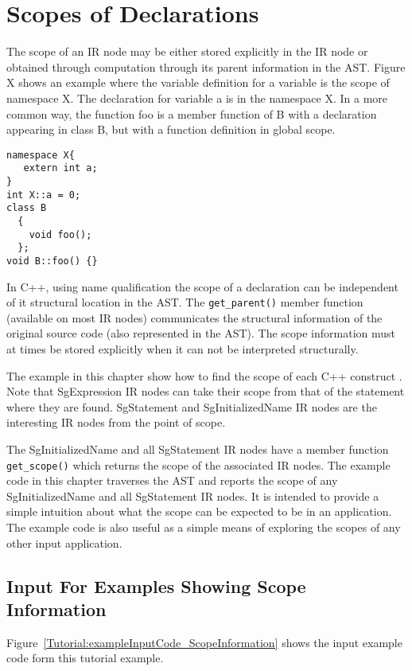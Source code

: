 \chapter{Scopes of Declarations}

     The scope of an IR node may be either stored explicitly in the IR node
or obtained through computation through its parent information in the AST.
Figure X shows an example where the variable definition for a variable is 
the scope of namespace X.  The declaration for variable a is in the namespace X.
In a more common way, the function foo is a member function of B with a
declaration appearing in class B, but with a function definition in global scope.
{\mySmallFontSize
\begin{verbatim}
namespace X{
   extern int a;
}
int X::a = 0;
class B
  {
    void foo();
  };
void B::foo() {}
\end{verbatim}
}
In C++, using name qualification the scope of a declaration can be independent of
it structural location in the AST.  The {\tt get\_parent()} member function (available 
on most IR nodes) communicates the structural information of the original source code
(also represented in the AST).  The scope information must at times be stored
explicitly when it can not be interpreted structurally.

   The example in this chapter show how to find the scope of each C++ construct
   .  Note that SgExpression IR nodes can take their scope from
that of the statement where they are found.  SgStatement and SgInitializedName
IR nodes are the interesting IR nodes from the point of scope.

   The SgInitializedName and all SgStatement IR nodes have a member function
{\tt get\_scope()} which returns the scope of the associated IR nodes.  The
example code in this chapter traverses the AST and reports the scope of any
SgInitializedName and all SgStatement IR nodes.  It is intended to provide
a simple intuition about what the scope can be expected to be in an application.
The example code is also useful as a simple means of exploring the scopes
of any other input application.

\section{Input For Examples Showing Scope Information}

   Figure~\ref{Tutorial:exampleInputCode_ScopeInformation}
shows the input example code form this tutorial example.

